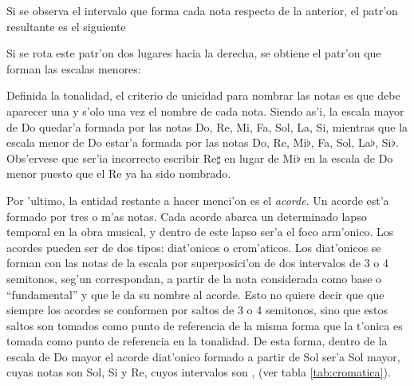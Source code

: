 \begin{center}
      
\end{center}

Si se observa el intervalo que forma cada nota respecto de la anterior, el patr'on resultante es el siguiente

\begin{center}
      
\end{center}

Si se rota este patr'on dos lugares hacia la derecha, se obtiene el patr'on que forman las escalas menores:

\begin{center}
       
\end{center}

Definida la tonalidad, el criterio de unicidad para nombrar las notas es que debe aparecer una y s'olo una vez el nombre de cada nota. Siendo as'i,
la escala mayor de Do quedar'a formada por las notas Do, Re, Mi, Fa, Sol, La, Si, mientras que la escala menor de Do estar'a formada
por las notas Do, Re, Mi$\flat$, Fa, Sol, La$\flat$, Si$\flat$. Obs'ervese que ser'ia incorrecto escribir Re$\sharp$ en lugar de Mi$\flat$ en la
escala de Do menor puesto que el Re ya ha sido nombrado.

Por 'ultimo, la entidad restante a hacer menci'on es el \emph{acorde}. Un acorde est'a formado por tres o m'as notas. Cada acorde abarca un determinado
lapso temporal en la obra musical, y dentro de este lapso ser'a el foco arm'onico. Los acordes pueden ser de dos tipos: diat'onicos o crom'aticos. 
Los diat'onicos se forman con las notas de la escala por superposici'on de dos intervalos de 3 o 4 semitonos, seg'un correspondan, a partir de la nota 
considerada como base o ``fundamental'' y que le da su nombre al acorde. 
Esto no quiere decir que que siempre los acordes se conformen por saltos de 3 o 4 semitonos, sino que estos saltos son tomados como punto de referencia
de la misma forma que la t'onica es tomada como punto de referencia en la tonalidad.
De esta forma, dentro de la escala de Do mayor el acorde diat'onico formado a partir de Sol ser'a Sol mayor, cuyas notas son Sol, Si y Re, cuyos intervalos
son ,  (ver tabla \ref{tab:cromatica}). 

